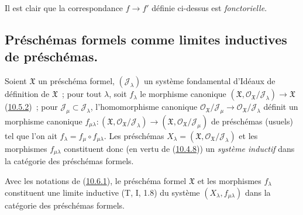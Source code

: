 Il est clair que la correspondance $f\to f'$ définie ci-dessus est
\emph{fonctorielle}.

\subsection{Préschémas formels comme limites inductives de préschémas.}
\label{subsection:I.10.6-fr}

\begin{env}[10.6.1]
\label{I.10.6.1-fr}
Soient $\mathfrak{X}$ un préschéma formel,
$(\mathscr{J}_\lambda)$ un système fondamental d'Idéaux de définition de
$\mathfrak{X}$~; pour tout $\lambda$, soit $f_\lambda$ le morphisme
canonique
$(\mathfrak{X},\mathscr{O}_{\mathfrak{X}}/\mathscr{J}_\lambda)
\to\mathfrak{X}$ (\hyperref[I.10.5.2-fr]{10.5.2})~; pour
$\mathscr{J}_\mu\subset\mathscr{J}_\lambda$, l'homomorphisme canonique
$\mathscr{O}_{\mathfrak{X}}/\mathscr{J}_\mu\to
\mathscr{O}_{\mathfrak{X}}/\mathscr{J}_\lambda$ définit un morphisme
canonique
$f_{\mu\lambda}:(\mathfrak{X},
\mathscr{O}_{\mathfrak{X}}/\mathscr{J}_\lambda)\to
(\mathfrak{X},\mathscr{O}_{\mathfrak{X}}/\mathscr{J}_\mu)$ de préschémas
(usuels) tel que l'on ait $f_\lambda=f_\mu\circ f_{\mu\lambda}$. Les
préschémas
$X_\lambda=(\mathfrak{X},
\mathscr{O}_{\mathfrak{X}}/\mathscr{J}_\lambda)$ et les morphismes
$f_{\mu\lambda}$ constituent donc (en vertu de
(\hyperref[I.10.4.8-fr]{10.4.8})) un \emph{système inductif} dans la
catégorie des préschémas formels.
\end{env}

\begin{proposition}[10.6.2]
\label{I.10.6.2-fr}
Avec les notations de \textup{(\hyperref[I.10.6.1-fr]{10.6.1})}, le préschéma
formel $\mathfrak{X}$ et les morphismes $f_\lambda$ constituent une
limite inductive \textup{(T, I, 1.8)} du système $(X_\lambda,f_{\mu\lambda})$
dans la catégorie des préschémas formels.
\end{proposition}

